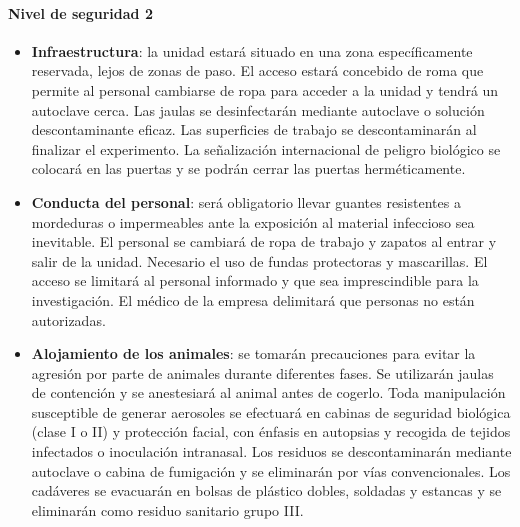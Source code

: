\paragraph{Nivel de seguridad 2 }
\begin{itemize}[itemsep=0pt,parsep=0pt,topsep=0pt,partopsep=0pt]
    \item \textbf{Infraestructura}: la unidad estará situado en una zona específicamente reservada, lejos de zonas de paso. El acceso estará concebido de roma que permite al personal cambiarse de ropa para acceder a la unidad y tendrá un autoclave cerca. Las jaulas se desinfectarán mediante autoclave o solución descontaminante eficaz. Las superficies de trabajo se descontaminarán al finalizar el experimento. La señalización internacional de peligro biológico se colocará en las puertas y se podrán cerrar las puertas herméticamente.
    \item \textbf{Conducta del personal}: será obligatorio llevar guantes resistentes a mordeduras o impermeables ante la exposición al material infeccioso sea inevitable. El personal se cambiará de ropa de trabajo y zapatos al entrar y salir de la unidad. Necesario el uso de fundas protectoras y mascarillas. El acceso se limitará al personal informado y que sea imprescindible para la investigación. El médico de la empresa delimitará que personas no están autorizadas.
    \item \textbf{Alojamiento de los animales}: se tomarán precauciones para evitar la agresión por parte de animales durante diferentes fases. Se utilizarán jaulas de contención y se anestesiará al animal antes de cogerlo. Toda manipulación susceptible de generar aerosoles se efectuará en cabinas de seguridad biológica (clase I o II) y protección facial, con énfasis en autopsias y recogida de tejidos infectados o inoculación intranasal. Los residuos se descontaminarán mediante autoclave o cabina de fumigación y se eliminarán  por vías convencionales. Los cadáveres se evacuarán en bolsas de plástico dobles, soldadas y estancas y se eliminarán como residuo sanitario grupo III.
\end{itemize}
